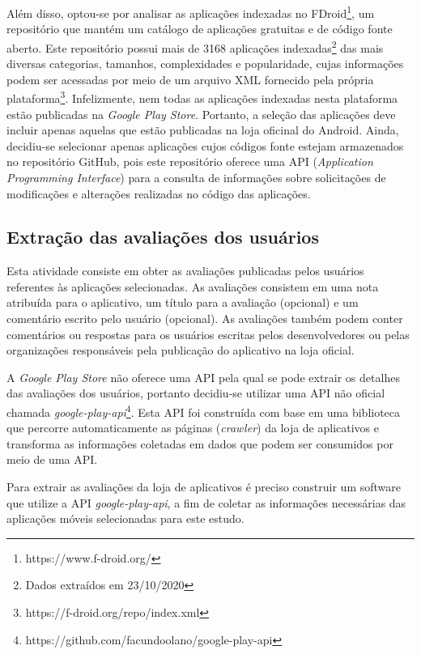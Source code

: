 Além disso, optou-se por analisar as aplicações indexadas no FDroid\footnote{https://www.f-droid.org/}, um repositório que mantém um catálogo de aplicações gratuitas e de código fonte aberto. Este repositório possui mais de 3168 aplicações indexadas\footnote{Dados extraídos em 23/10/2020} das mais diversas categorias, tamanhos, complexidades e popularidade, cujas informações podem ser acessadas por meio de um arquivo XML fornecido pela própria plataforma\footnote{https://f-droid.org/repo/index.xml}.
Infelizmente, nem todas as aplicações indexadas nesta plataforma estão publicadas na \textit{Google Play Store}. Portanto, a seleção das aplicações deve incluir apenas aquelas que estão publicadas na loja oficinal do Android. Ainda, decidiu-se selecionar apenas aplicações cujos códigos fonte estejam armazenados no repositório GitHub, pois este repositório oferece uma API (\textit{Application Programming Interface}) para a consulta de informações sobre solicitações de modificações e alterações realizadas no código das aplicações.


\subsection{Extração das avaliações dos usuários}
\label{sec:extracaoavaliacoes}

Esta atividade consiste em obter as avaliações publicadas pelos usuários referentes às aplicações selecionadas. As avaliações consistem em uma nota atribuída para o aplicativo, um título para a avaliação (opcional) e um comentário escrito pelo usuário (opcional). As avaliações também podem conter comentários ou respostas para os usuários escritas pelos desenvolvedores ou pelas organizações responsáveis pela publicação do aplicativo na loja oficial. 

A \textit{Google Play Store} não oferece uma API pela qual se pode extrair os detalhes das avaliações dos usuários, portanto decidiu-se utilizar uma API não oficial chamada \textit{google-play-api}\footnote{https://github.com/facundoolano/google-play-api}. Esta API foi construída com base em uma biblioteca que percorre automaticamente as páginas (\textit{crawler}) da loja de aplicativos e transforma as informações coletadas em dados que podem ser consumidos por meio de uma API.

Para extrair as avaliações da loja de aplicativos é preciso construir um software que utilize a API \textit{google-play-api}, a fim de coletar as informações necessárias das aplicações móveis selecionadas para este estudo. 

